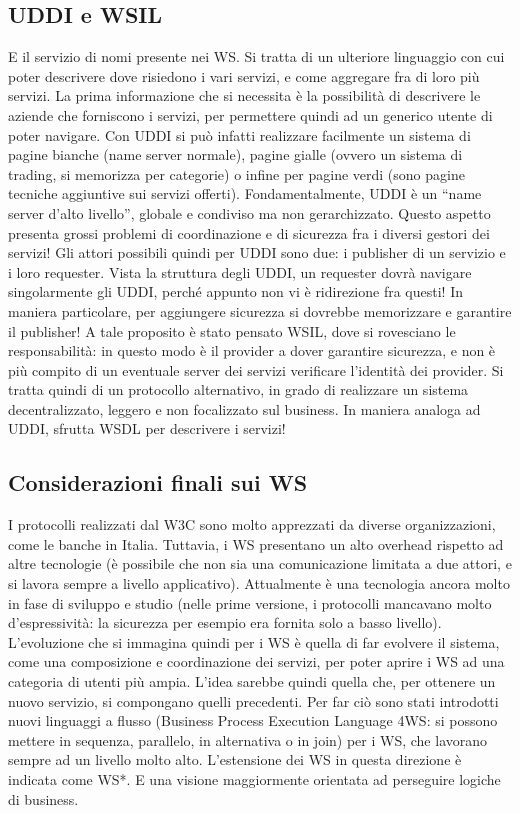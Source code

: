 \subsection{UDDI e WSIL}
E il servizio di nomi presente nei WS. Si tratta di un ulteriore linguaggio con cui poter descrivere dove risiedono i
vari servizi, e come aggregare fra di loro più servizi. La prima informazione che si necessita è la possibilità di
descrivere le aziende che forniscono i servizi, per permettere quindi ad un generico utente di poter navigare.
Con UDDI si può infatti realizzare facilmente un sistema di pagine bianche (name server normale), pagine gialle
(ovvero un sistema di trading, si memorizza per categorie) o infine per pagine verdi (sono pagine tecniche aggiuntive
sui servizi offerti). Fondamentalmente, UDDI è un ``name server d'alto livello'', globale e condiviso ma non
gerarchizzato. Questo aspetto presenta grossi problemi di coordinazione e di sicurezza fra i diversi gestori dei
servizi!
Gli attori possibili quindi per UDDI sono due: i publisher di un servizio e i loro requester. Vista la struttura degli
UDDI, un requester dovrà navigare singolarmente gli UDDI, perché appunto non vi è ridirezione fra questi! In maniera
particolare, per aggiungere sicurezza si dovrebbe memorizzare e garantire il publisher!
A tale proposito è stato pensato WSIL, dove si rovesciano le responsabilità: in questo modo è il provider a dover
garantire sicurezza, e non è più compito di un eventuale server dei servizi verificare l'identità dei provider. Si
tratta quindi di un protocollo alternativo, in grado di realizzare un sistema decentralizzato, leggero e non
focalizzato sul business. In maniera analoga ad UDDI, sfrutta WSDL per descrivere i servizi!
\subsection{Considerazioni finali sui WS}
I protocolli realizzati dal W3C sono molto apprezzati da diverse organizzazioni, come le banche in Italia. Tuttavia,
i WS presentano un alto overhead rispetto ad altre tecnologie (è possibile che non sia una comunicazione limitata a
due attori, e si lavora sempre a livello applicativo). Attualmente è una tecnologia ancora molto in fase di sviluppo
e studio (nelle prime versione, i protocolli mancavano molto d'espressività: la sicurezza per esempio era fornita
solo a basso livello).
L'evoluzione che si immagina quindi per i WS è quella di far evolvere il sistema, come una composizione e coordinazione
dei servizi, per poter aprire i WS ad una categoria di utenti più ampia. L'idea sarebbe quindi quella che, per
ottenere un nuovo servizio, si compongano quelli precedenti. Per far ciò sono stati introdotti nuovi linguaggi a
flusso (Business Process Execution Language 4WS: si possono mettere in sequenza, parallelo, in alternativa o in join)
per i WS, che lavorano sempre ad un livello molto alto. L'estensione dei WS in questa direzione è indicata come WS*.
E una visione maggiormente orientata ad perseguire logiche di business.
